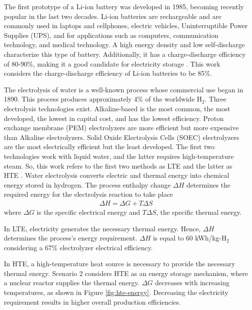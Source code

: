 \documentclass{anstrans}
\begin{document}
The first prototype of a Li-ion battery was developed in 1985, becoming recently popular in the last two decades.
Li-ion batteries are rechargeable and are commonly used in laptops and cellphones, electric vehicles, Uninterruptible Power Supplies (UPS), and for applications such as computers, communication technology, and medical technology.
A high energy density and low self-discharge characterize this type of battery.
Additionally, it has a charge-discharge efficiency of 80-90\%, making it a good candidate for electricity storage \cite{sun_car_2010}.
This work considers the charge-discharge efficiency of Li-ion batteries to be 85\%.

The electrolysis of water is a well-known process whose commercial use began in 1890.
This process produces approximately 4\% of the worldwide H$_2$.
Three electrolysis technologies exist.
Alkaline-based is the most common, the most developed, the lowest in capital cost, and has the lowest efficiency.
Proton exchange membrane (PEM) electrolyzers are more efficient but more expensive than Alkaline electrolyzers.
Solid Oxide Electrolysis Cells (SOEC) electrolyzers are the most electrically efficient but the least developed.
The first two technologies work with liquid water, and the latter requires high-temperature steam.
So, this work refers to the first two methods as \gls{LTE} and the latter as \gls{HTE} \cite{fairhurst-agosta_multi-physics_2020}.
Water electrolysis converts electric and thermal energy into chemical energy stored in hydrogen.
The process enthalpy change $\Delta H$ determines the required energy for the electrolysis reaction to take place
\begin{align}
  \Delta H = \Delta G + T \Delta S
\end{align}
where $\Delta G$ is the specific electrical energy and $T \Delta S$, the specific thermal energy.

In LTE, electricity generates the necessary thermal energy.
Hence, $\Delta H$ determines the process’s energy requirement.
$\Delta H$ is equal to 60 kWh/kg-H$_2$ considering a 67\% electrolyzer electrical efficiency.

In HTE, a high-temperature heat source is necessary to provide the necessary thermal energy.
Scenario 2 considers HTE as an energy storage mechanism, where a nuclear reactor supplies the thermal energy.
$\Delta G$ decreases with increasing temperatures, as shown in Figure \ref{fig:hte-energy}.
Decreasing the electricity requirement results in higher overall production efficiencies.
\end{document}
